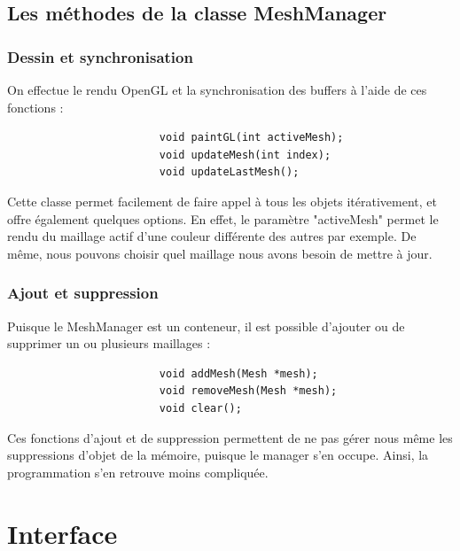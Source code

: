 \documentclass[a4paper]{memoir}
\begin{document}
			\subsection{Les méthodes de la classe MeshManager}
				\label{manager-dev}
				\subsubsection{Dessin et synchronisation}
					On effectue le rendu OpenGL et la synchronisation des buffers à l'aide de ces fonctions :
					\begin{verbatim}
						void paintGL(int activeMesh);
						void updateMesh(int index);
						void updateLastMesh();
					\end{verbatim}
					Cette classe permet facilement de faire appel à tous les objets itérativement, et offre également quelques options. En effet, le 
					paramètre "activeMesh" permet le rendu du maillage actif d'une couleur différente des autres par exemple. De même, nous pouvons choisir 
					quel maillage nous avons besoin de mettre à jour.
					
				\subsubsection{Ajout et suppression}
					Puisque le MeshManager est un conteneur, il est possible d'ajouter ou de supprimer un ou plusieurs maillages :
					\begin{verbatim}
						void addMesh(Mesh *mesh);
						void removeMesh(Mesh *mesh);
						void clear();
					\end{verbatim}
					Ces fonctions d'ajout et de suppression permettent de ne pas gérer nous même les suppressions d'objet de la mémoire, puisque le manager 
					s'en occupe. Ainsi, la programmation s'en retrouve moins compliquée.
		
		\section{Interface}
			
\end{document}
